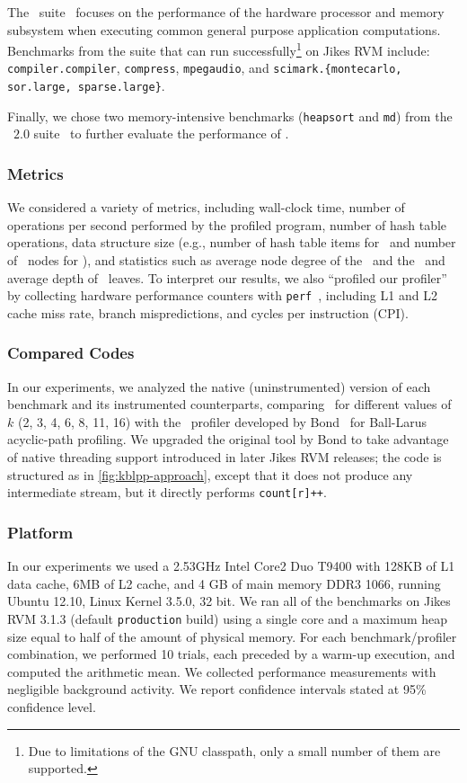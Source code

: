 The \specjvm\ suite~\cite{SpecJVM2008} focuses on the performance of the hardware processor and memory subsystem when executing common general purpose application computations. Benchmarks from the suite that can run successfully\footnote{Due to limitations of the GNU classpath, only a small number of them are supported.} on Jikes RVM include: {\tt compiler.compiler}, {\tt compress}, {\tt mpegaudio}, and {\tt scimark.\{montecarlo, sor.large, sparse.large\}}.

Finally, we chose two memory-intensive benchmarks ({\tt heapsort} and {\tt md}) from the \javagrande\ $2.0$ suite~\cite{Bull99} to further evaluate the performance of \kblpp.

\subsubsection*{Metrics}
We considered a variety of metrics, including wall-clock time, number of operations per second performed by the profiled program, number of hash table operations, data structure size (e.g., number of hash table items for \blpp\ and number of \ksf\ nodes for \kblpp), and statistics such as average node degree of the \ksf\ and the \kipf\ and average depth of \kipf\ leaves. To interpret our results, we also ``profiled our profiler'' by collecting hardware performance counters with {\tt perf}~\cite{perf}, including L1 and L2 cache miss rate, branch mispredictions, and cycles per instruction (CPI).

\subsubsection*{Compared Codes}
In our experiments, we analyzed the native (uninstrumented) version of each benchmark and its instrumented counterparts, comparing \kblpp\ for different values of $k$ (2, 3, 4, 6, 8, 11, 16) with the \blpp\ profiler developed by Bond~\cite{PEP} for Ball-Larus acyclic-path profiling. We upgraded the original tool by Bond to take advantage of native threading support introduced in later Jikes RVM releases; the code is structured as in \myfigure\ref{fig:kblpp-approach}, except that it does not produce any intermediate stream, but it directly performs {\tt count[r]++}.

\subsubsection*{Platform}
In our experiments we used a 2.53GHz Intel Core2 Duo T9400 with 128KB of L1 data cache, 6MB of L2 cache, and 4 GB of main memory DDR3 1066, running Ubuntu 12.10, Linux Kernel 3.5.0, 32 bit. We ran all of the benchmarks on Jikes RVM 3.1.3 (default {\tt production} build) using a single core and a maximum heap size equal to half of the amount of physical memory. For each benchmark/profiler combination, we performed 10 trials, each preceded by a warm-up execution, and computed the arithmetic mean. We collected performance measurements with negligible background activity. We report confidence intervals stated at 95\% confidence level.

